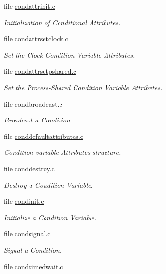 \begin{DoxyCompactItemize}
file \mbox{\hyperlink{condattrinit_8c}{condattrinit.\+c}}
\begin{DoxyCompactList}\small\item\em Initialization of Conditional Attributes. \end{DoxyCompactList}\item 
file \mbox{\hyperlink{condattrsetclock_8c}{condattrsetclock.\+c}}
\begin{DoxyCompactList}\small\item\em Set the Clock Condition Variable Attributes. \end{DoxyCompactList}\item 
file \mbox{\hyperlink{condattrsetpshared_8c}{condattrsetpshared.\+c}}
\begin{DoxyCompactList}\small\item\em Set the Process-\/\+Shared Condition Variable Attributes. \end{DoxyCompactList}\item 
file \mbox{\hyperlink{condbroadcast_8c}{condbroadcast.\+c}}
\begin{DoxyCompactList}\small\item\em Broadcast a Condition. \end{DoxyCompactList}\item 
file \mbox{\hyperlink{conddefaultattributes_8c}{conddefaultattributes.\+c}}
\begin{DoxyCompactList}\small\item\em Condition variable Attributes structure. \end{DoxyCompactList}\item 
file \mbox{\hyperlink{conddestroy_8c}{conddestroy.\+c}}
\begin{DoxyCompactList}\small\item\em Destroy a Condition Variable. \end{DoxyCompactList}\item 
file \mbox{\hyperlink{condinit_8c}{condinit.\+c}}
\begin{DoxyCompactList}\small\item\em Initialize a Condition Variable. \end{DoxyCompactList}\item 
file \mbox{\hyperlink{condsignal_8c}{condsignal.\+c}}
\begin{DoxyCompactList}\small\item\em Signal a Condition. \end{DoxyCompactList}\item 
file \mbox{\hyperlink{condtimedwait_8c}{condtimedwait.\+c}}

\end{DoxyCompactItemize}
